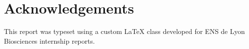 \documentclass[orange]{enslyonstage}
\begin{document}
\paragraph{}


\section*{Acknowledgements}

This report was typeset using a custom \LaTeX{} class developed for ENS de Lyon Biosciences internship reports.

\balance
\biblio
\end{document}

